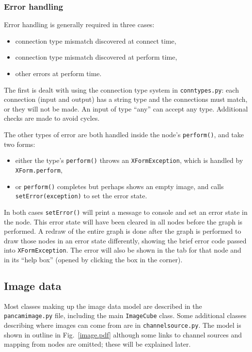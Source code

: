 \subsubsection{Error handling}
\label{errorhandling}
Error handling is generally required in three cases:
\begin{itemize}
\item connection type mismatch discovered at connect time,
\item connection type mismatch discovered at perform time,
\item other errors at perform time.
\end{itemize}
The first is dealt with using the connection type system
in \texttt{conntypes.py}: each connection (input and output) has a string
type and the connections must match, or they will not be made. An input
of type ``any'' can accept any type. Additional checks are made to avoid
cycles.

The other types of error are both handled inside the node's \texttt{perform()},
and take two forms:
\begin{itemize}
\item either the type's \texttt{perform()} throws an \texttt{XFormException}, which
is handled by \texttt{XForm.perform},
\item or \texttt{perform()} completes but perhaps shows an empty image,
and calls \texttt{setError(exception)} to set the error state.
\end{itemize}
In both cases \texttt{setError()} will print a message to console and
set an error state in the node. This error state
will have been cleared in all nodes before the graph is performed. A redraw of the
entire graph is done after the graph is performed to
draw those nodes in an error state differently, showing the 
brief error code passed into \texttt{XFormException}. The error
will also be shown in the tab for that node and in its ``help box''
(opened by clicking the box in the corner).

\subsection{Image data}
Most classes making up the image data 
model are described in the \texttt{pancamimage.py} file, including the main \texttt{ImageCube}
class. Some additional classes describing where images can come from are in \texttt{channelsource.py}.
The model is shown in outline in Fig.~\ref{image.pdf} although some links to channel sources
and mapping from nodes are omitted; these will be explained later.

